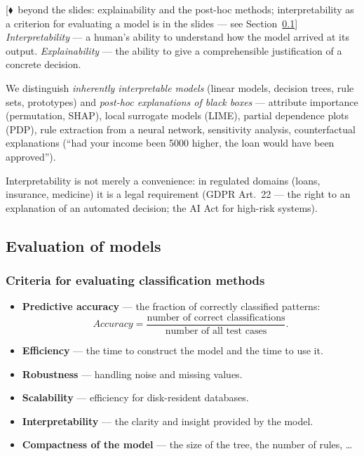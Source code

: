 \documentclass[11pt,a4paper]{article}
\theoremstyle{definition}
\providecommand{\uv}[1]{``#1''}
\newcommand{\mimoq}[1]{\textcolor{markcol}{\textsf{\footnotesize[$\blacklozenge$~beyond the slides: #1]}}}
\begin{document}
\begin{defbox}
\mimoq{explainability and the post-hoc methods; interpretability as a criterion for evaluating a
model is in the slides --- see Section~\ref{ssec:eval}}
\emph{Interpretability} --- a human's ability to understand how the model arrived at its output.
\emph{Explainability} --- the ability to give a comprehensible justification of a concrete
decision.

We distinguish \emph{inherently interpretable models} (linear models, decision trees, rule sets,
prototypes) and \emph{post-hoc explanations of black boxes} --- attribute importance (permutation,
SHAP), local surrogate models (LIME), partial dependence plots (PDP), rule extraction from a
neural network, sensitivity analysis, counterfactual explanations (\uv{had your income been 5000
higher, the loan would have been approved}).

Interpretability is not merely a convenience: in regulated domains (loans, insurance, medicine) it
is a legal requirement (GDPR Art.~22 --- the right to an explanation of an automated decision; the
AI Act for high-risk systems).
\end{defbox}

\subsection{Evaluation of models}
\label{ssec:eval}

\subsubsection{Criteria for evaluating classification methods}

\begin{itemize}
\item \textbf{Predictive accuracy} --- the fraction of correctly classified patterns:
      \[ \mathit{Accuracy}=\frac{\text{number of correct classifications}}
         {\text{number of all test cases}}. \]
\item \textbf{Efficiency} --- the time to construct the model and the time to use it.
\item \textbf{Robustness} --- handling noise and missing values.
\item \textbf{Scalability} --- efficiency for disk-resident databases.
\item \textbf{Interpretability} --- the clarity and insight provided by the model.
\item \textbf{Compactness of the model} --- the size of the tree, the number of rules, \dots
\end{itemize}
\end{document}
